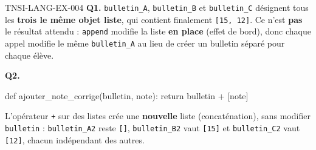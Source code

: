 %
\begin{corrige}{TNSI-LANG-EX-004}
\textbf{Q1.} \lstinline{bulletin_A}, \lstinline{bulletin_B} et \lstinline{bulletin_C} désignent tous les \textbf{trois le même objet liste}, qui contient finalement \lstinline{[15, 12]}. Ce n'est \textbf{pas} le résultat attendu : \lstinline{append} modifie la liste \textbf{en place} (effet de bord), donc chaque appel modifie le même \lstinline{bulletin_A} au lieu de créer un bulletin séparé pour chaque élève.

\textbf{Q2.}
\begin{python}
def ajouter_note_corrige(bulletin, note):
    return bulletin + [note]
\end{python}
L'opérateur \lstinline{+} sur des listes crée une \textbf{nouvelle} liste (concaténation), sans modifier \lstinline{bulletin} : \lstinline{bulletin_A2} reste \lstinline{[]}, \lstinline{bulletin_B2} vaut \lstinline{[15]} et \lstinline{bulletin_C2} vaut \lstinline{[12]}, chacun indépendant des autres.
\end{corrige}
